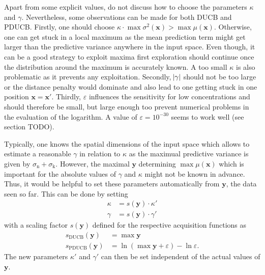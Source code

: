 \documentclass[11pt,a4paper,twoside,BCOR=15mm]{scrreprt}
\newcommand{\vc}[1]{\bm{#1}}
\newcommand{\ped}[1]{_{\mathrm{#1}}}
\begin{document}
Apart from some explicit values, \textcite{Marchant:2012wb} do not discuss how 
to choose the parameters $\kappa$ and $\gamma$. Nevertheless, some observations 
can be made for both DUCB and PDUCB\@. Firstly, one should choose $\kappa \cdot 
\max \sigma^2(\vc x) > \max \mu(\vc x)$. Otherwise, one can get stuck in a local 
maximum as the mean prediction term might get larger than the predictive 
variance anywhere in the input space. Even though, it can be a good strategy to 
exploit maxima first exploration should continue once the distribution around 
the maximum is accurately known. A too small $\kappa$ is also problematic as it 
prevents any exploitation. Secondly, $\abs{\gamma}$ should not be too large or 
the distance penalty would dominate and also lead to one getting stuck in one 
position $\vc x = \vc x'$. Thirdly, $\varepsilon$ influences the sensitivity for 
low concentrations and should therefore be small, but large enough too prevent 
numerical problems in the evaluation of the logarithm. A value of $\varepsilon 
= 10^{-30}$ seems to work well (see section TODO).

Typically, one knows the spatial dimensions of the input space which allows to 
estimate a reasonable $\gamma$ in relation to $\kappa$ as the maximual 
predictive variance is given by $\sigma\ped{n} + \sigma\ped{k}$.  However, the 
maximal $\vc y$ determining $\max \mu(\vc x)$ which is important for the 
absolute values of $\gamma$ and $\kappa$ might not be known in advance.  Thus, 
it would be helpful to set these parameters automatically from $\vc y$, the data 
seen so far.  This can be done by setting
\begin{align}
    \kappa &= s(\vc y) \cdot \kappa' \\
    \gamma &= s(\vc y) \cdot \gamma'
\end{align}
with a scaling factor $s(\vc y)$ defined for the respective acquisition 
functions as
\begin{align}
    s\ped{DUCB}(\vc y) &= \max \vc y \\
    s\ped{PDUCB}(\vc y) &= \ln(\max \vc y + \varepsilon) - \ln \varepsilon 
    \text{.}
\end{align}
The new parameters $\kappa'$ and $\gamma'$ can then be set independent of the 
actual values of $\vc y$.
\end{document}
